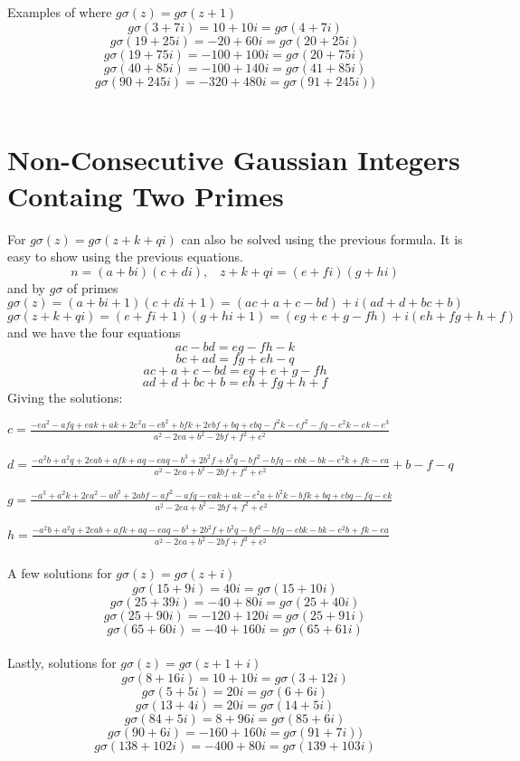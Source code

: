 \documentclass[12pt]{amsart}
\begin{document}
Examples of where $g\sigma(z) = g\sigma(z+1)$
\\
$$g\sigma(3 + 7i) = 10 + 10i = g\sigma(4 + 7i)$$
$$g\sigma(19 + 25i) = -20 + 60i = g\sigma(20 + 25i)$$
$$g\sigma(19 + 75i) = -100 + 100i = g\sigma(20 + 75i)$$
$$g\sigma(40 + 85i) = -100 + 140i  = g\sigma(41 + 85i)$$
$$g\sigma(90 + 245i) = -320 + 480i  = g\sigma(91 + 245i))$$
\\

\section{Non-Consecutive Gaussian Integers Containg Two Primes}
For $g\sigma(z) = g\sigma(z+k+qi)$ can also be solved using the previous formula. It is easy to show using the previous equations. 
$$n = (a + bi)(c+di), \; \; \; z+k+qi = (e + fi)(g + hi)$$ 
and by $g\sigma$ of primes 
$$ g\sigma(z) = (a + bi + 1)(c + di + 1) = (ac + a + c -bd) + i(ad + d + bc + b)$$
$$ g\sigma(z+k+qi) = (e + fi + 1)(g + hi + 1) = (eg + e + g - fh) + i(eh + fg + h + f)$$ 
and we have the four equations 
$$ac -bd = eg -fh - k$$ 
$$bc + ad = fg + eh - q$$ 
$$ac + a + c -bd = eg + e + g - fh$$ 
$$ad + d + bc + b = eh + fg + h + f$$
Giving the solutions:

$c = \frac{-ea^2 -afq + eak + ak + 2e^2a -eb^2 + bfk + 2ebf + bq + ebq -f^2k -ef^2 -fq-e^2k -ek -e^3}{a^2-2ea+b^2-2bf+f^2+e^2}$

$d = \frac{-a^2b+a^2q+2eab+afk+aq-eaq-b^3+2b^2f+b^2q-bf^2-bfq-ebk-bk-e^2k+fk-ea}{a^2-2ea+b^2-2bf+f^2+e^2} +b -f -q$

$g =\frac{-a^3 + a^2k + 2ea^2-ab^2+2abf-af^2-afq-eak+ak-e^2a+b^2k-bfk+bq+ebq-fq-ek}{a^2-2ea+b^2-2bf+f^2+e^2}$

$h = \frac{-a^2b+a^2q+2eab+afk+aq-eaq-b^3+2b^2f+b^2q-bf^2-bfq-ebk-bk-e^2b+fk-ea}{a^2-2ea+b^2-2bf+f^2+e^2} $
\\
\\
A few solutions for $g\sigma(z) = g\sigma(z+i)$
\\
$$g\sigma(15 + 9i) = 40i = g\sigma(15 + 10i)$$
$$g\sigma(25 + 39i) = -40 + 80i  = g\sigma( 25 + 40i)$$
$$g\sigma(25 + 90i) = -120 + 120i  = g\sigma(25 + 91i)$$
$$g\sigma(65 + 60i) = -40 + 160i = g\sigma(65 + 61i)$$
\\
Lastly, solutions for $g\sigma(z) = g\sigma(z+1+i)$
\\
$$g\sigma(8 + 16i) = 10 + 10i = g\sigma(3 + 12i)$$
$$g\sigma(5 + 5i) = 20i = g\sigma(6 + 6i)$$
$$g\sigma(13 + 4i) = 20i = g\sigma(14 + 5i)$$
$$g\sigma(84 + 5i) = 8 + 96i  = g\sigma(85 + 6i)$$
$$g\sigma(90 + 6i) = -160 + 160i  = g\sigma(91 + 7i))$$
$$g\sigma(138 + 102i) = -400 + 80i = g\sigma(139 + 103i)$$
\end{document}
